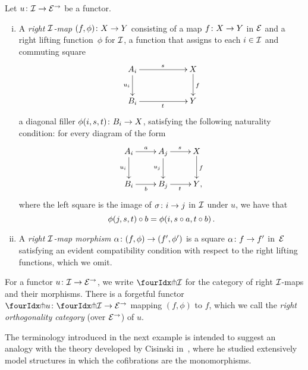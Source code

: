 \documentclass[reqno,10pt,a4paper,oneside,draft]{amsart}
\begin{document}
\begin{definition} \label{def:right-map}
Let $u \co \cal{I} \to \catE^\to$ be a functor.
\begin{enumerate}[(i)]
\item A \emph{right $\cal{I}$-map} $(f, \phi) \co X \to Y$ consisting of a map $f \co X \to Y$ in $\catE$ and a right lifting function~$\phi$ for $\cal{I}$, \ie a function that assigns to each $i \in \cal{I}$ and commuting square
\[
\xymatrix@C=2cm{
  A_i
  \ar[r]^{s}
  \ar[d]_{u_i}
&
  X
  \ar[d]^f
\\
  B_i
  \ar[r]_{t}
&
  Y
}
\]
a diagonal filler $\phi(i,s, t) \co B_i \to X$, satisfying the following naturality condition: for every diagram of the form
\[
\xymatrix{
  A_i
  \ar[r]^{a}
  \ar[d]_{u_i}
&
  A_j
  \ar[r]^{s}
  \ar[d]_{u_j}
&
  X
  \ar[d]^f
\\
  B_i
  \ar[r]_{b}
&
  B_j
  \ar[r]_{t}
&
  Y
\rlap{,}}
\]
where the left square is the image of $\sigma \co i \to j$ in $\cal{I}$ under $u$, we have that
\[
  \phi(j, s, t) \cc b = \phi(i, s \cc a, t \cc b) \, .
\]
\item A \emph{right $\cal{I}$-map morphism} $\alpha \co (f, \phi) \to (f', \phi')$ is a square $\alpha \co f \to f'$ in~$\catE$ satisfying an evident compatibility condition with respect to the right lifting functions, which we omit.
\end{enumerate}
\end{definition}

For a functor $u \co \cal{I} \to \catE^\to$, we write $\liftr{\cal{I}}$ for the category of right $\cal{I}$-maps and their morphisms.
There is a forgetful functor~$\liftr{u} \co \liftr{\cal{I}} \to \catE^\to$ mapping $(f, \phi)$ to $f$, which we call the \emph{right orthogonality category} (over $\catE^\to$) of $u$.

The terminology introduced in the next example is intended to suggest an analogy with the theory developed by Cisinski in~\cite{cisinski-asterisque}, where he studied extensively model structures in which the cofibrations are the monomorphisms.
\end{document}
